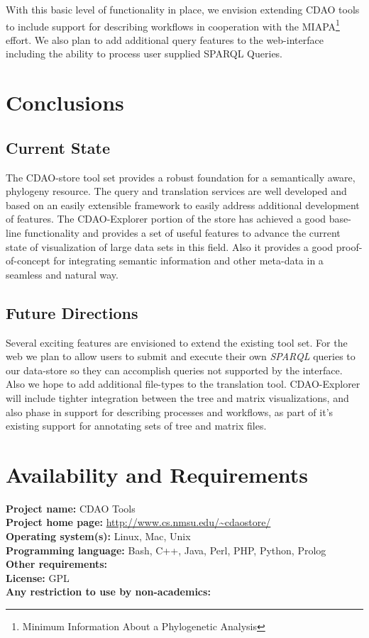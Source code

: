 \documentclass[10pt]{bmc_article}
\newenvironment{bmcformat}{\fussy\setboolean{publ}{true}}{\fussy}
\begin{document}
\begin{bmcformat}
  With this basic level of functionality in place, we envision extending CDAO tools to include support for describing
  workflows in cooperation with the MIAPA\footnote{Minimum Information About a Phylogenetic Analysis} effort.
  We also plan to add additional query features to the web-interface including the ability to process user supplied
  SPARQL Queries.
  

\section*{Conclusions}
   \subsection*{Current State}
     The CDAO-store tool set provides a robust foundation for a semantically aware, phylogeny resource. The query and translation
     services are well developed and based on an easily extensible framework to easily address additional development of features.
     The CDAO-Explorer portion of the store has achieved a good base-line functionality and provides a set of useful features
     to advance the current state of visualization of large data sets in this field. Also it provides a good proof-of-concept for
     integrating semantic information and other meta-data in a seamless and natural way. 

   \subsection*{Future Directions}
     Several exciting features are envisioned to extend the existing tool set. For the web we plan to allow users to submit and execute
     their own \textit{SPARQL} queries to our data-store so they can accomplish queries not supported by the interface. Also we hope to
     add additional file-types to the translation tool. CDAO-Explorer will include tighter integration between the tree and matrix 
     visualizations, and also phase in support for describing processes and workflows, as part of it's existing support for annotating
     sets of tree and matrix files.


  
\section*{Availability and Requirements}
  \textbf{Project name:} CDAO Tools\\
  \textbf{Project home page:} \url{http://www.cs.nmsu.edu/~cdaostore/} \\ 
  \textbf{Operating system(s):} Linux, Mac, Unix \\
  \textbf{Programming language:} Bash, C++, Java, Perl, PHP, Python, Prolog \\ 
  \textbf{Other requirements:} \\ 
  \textbf{License:} GPL \\ 
  \textbf{Any restriction to use by non-academics:} \\ 



\end{bmcformat}
\end{document}
